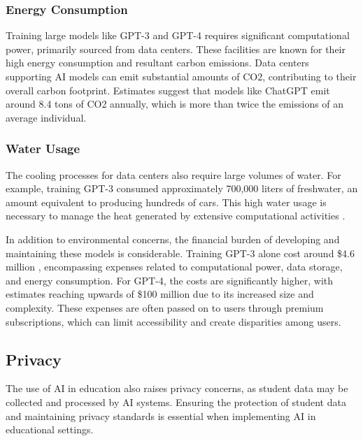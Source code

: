 \documentclass{article}
\begin{document}
\subsubsection{Energy Consumption}

Training large models like GPT-3 and GPT-4 requires significant
computational power, primarily sourced from data centers.
These facilities are known for their high energy consumption
and resultant carbon emissions. Data centers supporting AI
models can emit substantial amounts of CO2, contributing
to their overall carbon footprint. Estimates suggest that
models like ChatGPT emit around 8.4 tons of CO2 annually,
which is more than twice the emissions of an average individual.

\subsubsection{Water Usage}

The cooling processes for data centers also require
large volumes of water. For example, training GPT-3 consumed
approximately 700,000 liters of freshwater, an amount equivalent
to producing hundreds of cars. This high water usage is necessary
to manage the heat generated by extensive computational activities \cite{earth2023environmental}.

In addition to environmental concerns, the financial burden
of developing and maintaining these models is considerable.
Training GPT-3 alone cost around \$4.6 million \cite{wikipedia2024gpt3},
encompassing expenses related to computational power, data storage, and
energy consumption. For GPT-4, the costs are significantly higher,
with estimates reaching upwards of \$100 million \cite{wired2023altman}
due to its increased size and complexity.
These expenses are often passed on to users through premium subscriptions, which can limit accessibility and create disparities
among users.









\subsection{Privacy}

The use of AI in education also raises privacy concerns, as student data may be collected and processed by AI systems. Ensuring the protection of student data and maintaining privacy standards is essential when implementing AI in educational settings.
\end{document}

